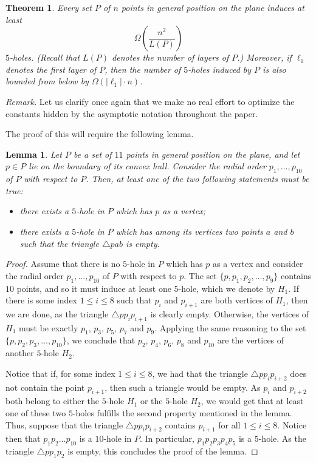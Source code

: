 \documentclass[12pt,reqno, a4paper]{amsart}
\newcounter{contSect} \numberwithin{contSect}{section}
\newtheorem{theorem}[contSect]{Theorem}
\newtheorem{lemma}[contSect]{Lemma}
\begin{document}
\begin{theorem}\label{thm:layers}
    Every set $P$ of $n$ points in general position on the plane induces at least \[\Omega\left(\frac{n^2}{L(P)}\right)\] $5$-holes. (Recall that $L(P)$ denotes the number of layers of $P$.) Moreover, if $\ell_1$ denotes the first layer of $P$, then the number of $5$-holes induced by $P$ is also bounded from below by $\Omega(|\ell_1|\cdot n)$.
\end{theorem}

\noindent\textit{Remark.} Let us clarify once again that we make no real effort to optimize the constants hidden by the asymptotic notation throughout the paper.
\medskip

The proof of this will require the following lemma.

\begin{lemma}\label{lem:pentagon_selection}
    Let $P$ be a set of $11$ points in general position on the plane, and let $p\in P$ lie on the boundary of its convex hull. Consider the radial order $p_1,\dots,p_{10}$ of $P$ with respect to $P$. Then, at least one of the two following statements must be true:

    \begin{itemize}
        \item there exists a $5$-hole in $P$ which has $p$ as a vertex;
        \item there exists a $5$-hole in $P$ which has among its vertices two points $a$ and $b$ such that the triangle $\triangle pab$ is empty.
    \end{itemize}
\end{lemma}

\begin{proof}
    Assume that there is no $5$-hole in $P$ which has $p$ as a vertex and consider the radial order $p_1,\dots,p_{10}$ of $P$ with respect to $p$. The set $\{p,p_1,p_2,\dots,p_{9}\}$ contains $10$ points, and so it must induce at least one $5$-hole, which we denote by $H_1$. If there is some index $1\leq i\leq8$ such that $p_i$ and $p_{i+1}$ are both vertices of $H_1$, then we are done, as the triangle $\triangle pp_ip_{i+1}$ is clearly empty. Otherwise, the vertices of $H_1$ must be exactly $p_1$, $p_3$, $p_5$, $p_7$ and $p_9$. Applying the same reasoning to the set $\{p,p_2,p_3,\dots,p_{10}\}$, we conclude that $p_2$, $p_4$, $p_6$, $p_8$ and $p_{10}$ are the vertices of another $5$-hole $H_2$.
    
    Notice that if, for some index $1\leq i \leq 8$, we had that the triangle $\triangle pp_ip_{i+2}$ does not contain the point $p_{i+1}$, then such a triangle would be empty. As $p_i$ and $p_{i+2}$ both belong to either the $5$-hole $H_1$ or the $5$-hole $H_2$, we would get that at least one of these two $5$-holes fulfills the second property mentioned in the lemma. Thus, suppose that the triangle $\triangle pp_ip_{i+2}$ contains $p_{i+1}$ for all $1\leq i\leq 8$. Notice then that $p_1p_2\dots p_{10}$ is a $10$-hole in $P$. In particular, $p_1p_2p_3p_4p_5$ is a $5$-hole. As the triangle $\triangle pp_1p_2$ is empty, this concludes the proof of the lemma.
\end{proof}
\end{document}
